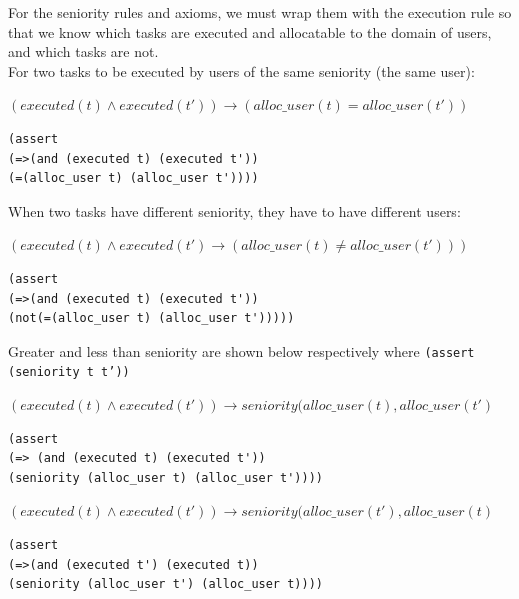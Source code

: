 \documentclass[a4paper]{report}
\begin{document}
For the seniority rules and axioms, we must wrap them with the execution rule so that we know which tasks are executed and allocatable to the domain of users, and which tasks are not. \\

For two tasks to be executed by users of the same seniority (the same user):
\begin{center}
$(executed(t) \wedge executed(t\ensuremath{'})) \longrightarrow (alloc\_user(t) = alloc\_user(t\ensuremath{'}))$
\end{center}
\begin{lstlisting}[frame=single]
(assert 
(=>(and (executed t) (executed t'))
(=(alloc_user t) (alloc_user t'))))
\end{lstlisting}

When two tasks have different seniority, they have to have different users:
\begin{center}
$(executed(t) \wedge executed(t\ensuremath{'}) \longrightarrow (alloc\_user(t) \neq alloc\_user(t\ensuremath{'})))$
\end{center}

\begin{lstlisting}[frame=single]
(assert 
(=>(and (executed t) (executed t'))
(not(=(alloc_user t) (alloc_user t')))))
\end{lstlisting}

Greater and less than seniority are shown below respectively where \texttt{(assert (seniority t t'))}
\begin{center}
$(executed(t) \wedge executed(t\ensuremath{'})) \longrightarrow seniority(alloc\_user(t), alloc\_user(t\ensuremath{'})$
\end{center}
\begin{lstlisting}[frame=single]
(assert 
(=> (and (executed t) (executed t'))
(seniority (alloc_user t) (alloc_user t'))))
\end{lstlisting}
\begin{center}
$(executed(t) \wedge executed(t\ensuremath{'})) \longrightarrow seniority(alloc\_user(t\ensuremath{'}), alloc\_user(t)$
\end{center}
\begin{lstlisting}[frame=single]
(assert 
(=>(and (executed t') (executed t))
(seniority (alloc_user t') (alloc_user t))))
\end{lstlisting}
\end{document}
